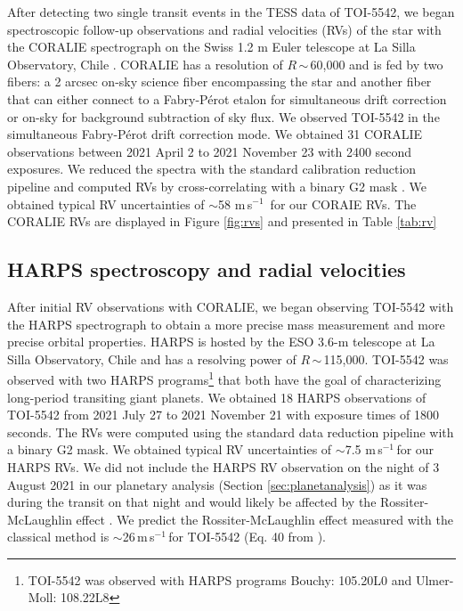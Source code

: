 \documentclass{aa}
\newcommand{\ms}{\mbox{m\,s$^{-1}$}}
\begin{document}
After detecting two single transit events in the TESS data of TOI-5542, we began spectroscopic follow-up observations and radial velocities (RVs) of the star with the CORALIE spectrograph on the Swiss 1.2 m Euler telescope at La Silla Observatory, Chile \citep{Queloz2001}. CORALIE has a resolution of $R$\,$\sim$\,60,000 and is fed by two fibers: a 2 arcsec on-sky science fiber encompassing the star and another fiber that can either connect to a Fabry-P\'erot etalon for simultaneous drift correction or on-sky for background subtraction of sky flux. We observed TOI-5542 in the simultaneous Fabry-P\'erot drift correction mode. We obtained 31 CORALIE observations between 2021 April 2 to 2021 November 23 with 2400 second exposures. We reduced the spectra with the standard calibration reduction pipeline and computed RVs by cross-correlating with a binary G2 mask \citep{Pepe2002}. We obtained typical RV uncertainties of $\sim$58 \ms\, for our CORAIE RVs. The CORALIE RVs are displayed in Figure \ref{fig:rvs} and presented in Table \ref{tab:rv}

\subsection{HARPS spectroscopy and radial velocities}

After initial RV observations with CORALIE, we began observing TOI-5542 with the HARPS spectrograph \citep{Pepe2002,Mayor2003} to obtain a more precise mass measurement and more precise orbital properties. HARPS is hosted by the ESO 3.6-m telescope at La Silla Observatory, Chile and has a resolving power of $R$\,$\sim$\,115,000. TOI-5542 was observed with two HARPS programs\footnote{TOI-5542 was observed with HARPS programs Bouchy: 105.20L0 and Ulmer-Moll: 108.22L8} that both have the goal of characterizing long-period transiting giant planets. We obtained 18 HARPS observations of TOI-5542 from 2021 July 27 to 2021 November 21 with exposure times of 1800 seconds. The RVs were computed using the standard data reduction pipeline with a binary G2 mask. We obtained typical RV uncertainties of $\sim$7.5 \ms\,for our HARPS RVs. We did not include the HARPS RV observation on the night of 3 August 2021 in our planetary analysis (Section \ref{sec:planetanalysis}) as it was during the transit on that night and would likely be affected by the Rossiter-McLaughlin effect \citep{Rossiter1924,McLaughlin1924}. We predict the Rossiter-McLaughlin effect measured with the classical method is $\sim$26\,\ms\,for TOI-5542 (Eq. 40 from \citealt{Winn2010}). 
\end{document}
